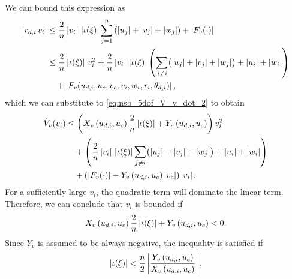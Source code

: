 We can bound this expression as
\begin{align}
    \left|r_{d,i}\,v_i\right| &\leq \frac{2}{n}\left|v_i\right|\,\left|\iota(\xi)\right|\sum_{j=1}^n\left(\left|u_j\right| + \left|v_j\right| + \left|w_j\right|\right) + \left|F_v(\cdot)\right| \nonumber \\
    &\leq \frac{2}{n}\left|\iota(\xi)\right|\,v_i^2 + \frac{2}{n}\left|v_i\right|\,\left|\iota(\xi)\right|\left(\sum_{j \neq i}\bigl(\left|u_j\right| + \left|v_j\right| + \left|w_j\right|\bigr) + \left|u_i\right| + \left|w_i\right|\right) \nonumber \\
    &\quad + \left|F_v(u_{d,i}, u_c, v_c, v_i, w_i, r_i, \theta_{d, i})\right|,
\end{align}
which we can substitute to \eqref{eq:nsb_5dof_V_v_dot_2} to obtain
\begin{equation}
    \begin{split}
        \dot{V}_v(v_i) &\leq \left(X_v\left(u_{d,i}, u_c\right)\frac{2}{n}\left|\iota(\xi)\right| + Y_v\left(u_{d,i}, u_c\right)\right)v_i^2 \\
        &\quad + \left(\frac{2}{n}\left|v_i\right|\,\left|\iota(\xi)\right|\sum_{j \neq i}\bigl(\left|u_j\right| + \left|v_j\right| + \left|w_j\right|\bigr) + \left|u_i\right| + \left|w_i\right|\right) \\
        & \quad + \left(\left|F_v(\cdot)\right| - Y_v\left(u_{d,i}, u_c\right)\left|v_c\right|\right) \left|v_i\right|.
    \end{split}
\end{equation}
For a sufficiently large $v_i$, the quadratic term will dominate the linear term.
Therefore, we can conclude that $v_i$ is bounded if 
\begin{equation}
    X_v\left(u_{d,i}, u_c\right)\frac{2}{n}\left|\iota(\xi)\right| + Y_v\left(u_{d,i}, u_c\right) < 0.
\end{equation}
Since $Y_v$ is assumed to be always negative, the inequality is satisfied if
\begin{equation}
    \left|\iota(\xi)\right| < \frac{n}{2}\left|\frac{Y_v\left(u_{d,i}, u_c\right)}{X_v\left(u_{d,i}, u_c\right)}\right|.
\end{equation}

